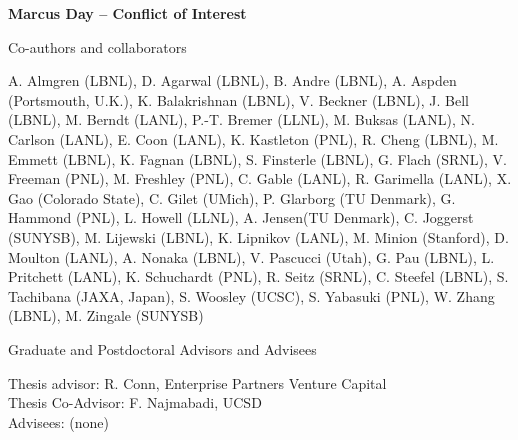 \documentclass[11pt]{article}
\begin{document}
\begin{center}
{\large{\bf Marcus Day -- Conflict of Interest}} \\
\end{center}

\vspace{.2 true in}

Co-authors and collaborators

\vspace{.1in}
A. Almgren (LBNL),
D. Agarwal (LBNL),
B. Andre (LBNL),
A. Aspden (Portsmouth, U.K.),
K. Balakrishnan (LBNL),
V. Beckner (LBNL),
J. Bell (LBNL),
M. Berndt (LANL),
P.-T. Bremer (LLNL),
M. Buksas (LANL),
N. Carlson (LANL),
E. Coon (LANL),
K. Kastleton (PNL),
R. Cheng (LBNL),
M. Emmett (LBNL),
K. Fagnan (LBNL),
S. Finsterle (LBNL),
G. Flach (SRNL),
V. Freeman (PNL),
M. Freshley (PNL),
C. Gable (LANL),
R. Garimella (LANL),
X. Gao (Colorado State),
C. Gilet (UMich),
P. Glarborg (TU Denmark),
G. Hammond (PNL),
L. Howell (LLNL),
A. Jensen(TU Denmark),
C. Joggerst (SUNYSB),
M. Lijewski (LBNL),
K. Lipnikov (LANL),
M. Minion (Stanford),
D. Moulton (LANL),
A. Nonaka (LBNL),
V. Pascucci (Utah),
G. Pau (LBNL),
L. Pritchett (LANL),
K. Schuchardt (PNL),
R. Seitz (SRNL),
C. Steefel (LBNL),
S. Tachibana (JAXA, Japan),
S. Woosley (UCSC),
S. Yabasuki (PNL),
W. Zhang (LBNL),
M. Zingale (SUNYSB)


\vspace{.2 true in}
Graduate and Postdoctoral Advisors and Advisees

\vspace{.1in}
Thesis advisor:  R. Conn, Enterprise Partners Venture Capital \\
Thesis Co-Advisor: F. Najmabadi, UCSD \\
Advisees: (none)
\end{document}
